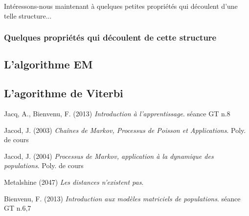 \documentclass[english]{article}
\begin{document}
Intéressons-nous maintenant à quelques petites propriétés qui découlent d'une telle structure...

\subsubsection{Quelques propriétés qui découlent de cette structure}

\subsection{L'algorithme EM}

\subsection{L'agorithme de Viterbi}
\newpage
\begin{thebibliography}{9}

  Jacq, A., Bienvenu, F. (2013)
  \emph{Introduction à l'apprentissage}.
  séance GT n.8
  
  Jacod, J. (2003)
  \emph{Cha\^ines de Markov, Processus de Poisson et Applications}.
  Poly. de cours
  
  Jacod, J. (2004)
  \emph{Processus de Markov, application à la dynamique des populations}.
  Poly. de cours

  Metalshine (2047)
  \emph{Les distances n'existent pas}.
  
  Bienvenu, F. (2013)
  \emph{Introduction aux modèles matriciels de populations}.
  séance GT n.6,7
  
  
\end{thebibliography}
\end{document}
